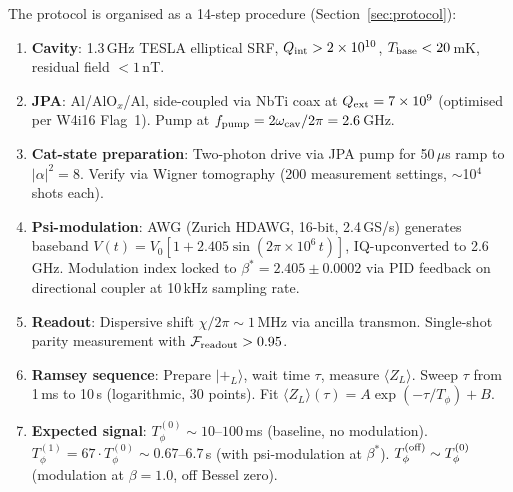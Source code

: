 \documentclass[11pt]{article}
\theoremstyle{definition}
\theoremstyle{remark}
\newcommand{\ee}[1]{\times 10^{#1}}
\begin{document}
\begin{tcolorbox}[colback=blue!5!white, colframe=blue!60!black,
  title=\textbf{W4i17 TOP 5 FINDINGS --- READ FIRST}]
\begin{enumerate}[nosep]
  The protocol is organised as a 14-step procedure (Section~\ref{sec:protocol}):
  \begin{enumerate}[nosep]
    \item \textbf{Cavity}: 1.3\,GHz TESLA elliptical SRF, $Q_{\rm int} > 2\ee{10}$,
      $T_{\rm base} < 20$\,mK, residual field $< 1$\,nT.
    \item \textbf{JPA}: Al/AlO$_x$/Al, side-coupled via NbTi coax at
      $Q_{\rm ext} = 7\ee{9}$ (optimised per W4i16 Flag~1). Pump at
      $f_{\rm pump} = 2\omega_{\rm cav}/2\pi = 2.6$\,GHz.
    \item \textbf{Cat-state preparation}: Two-photon drive via JPA pump
      for 50\,$\mu$s ramp to $|\alpha|^2 = 8$. Verify via Wigner
      tomography (200 measurement settings, $\sim$10$^4$ shots each).
    \item \textbf{Psi-modulation}: AWG (Zurich HDAWG, 16-bit, 2.4\,GS/s)
      generates baseband $V(t) = V_0[1 + 2.405\sin(2\pi\ee{6}\,t)]$,
      IQ-upconverted to 2.6\,GHz. Modulation index locked to
      $\beta^* = 2.405 \pm 0.0002$ via PID feedback on directional
      coupler at 10\,kHz sampling rate.
    \item \textbf{Readout}: Dispersive shift $\chi/2\pi \sim 1$\,MHz via
      ancilla transmon. Single-shot parity measurement with
      $\mathcal{F}_{\rm readout} > 0.95$.
    \item \textbf{Ramsey sequence}: Prepare $|+_L\rangle$, wait time $\tau$,
      measure $\langle Z_L\rangle$. Sweep $\tau$ from 1\,ms to 10\,s
      (logarithmic, 30 points). Fit $\langle Z_L\rangle(\tau) =
      A\exp(-\tau/T_\phi) + B$.
    \item \textbf{Expected signal}: $T_\phi^{(0)} \sim 10$--$100$\,ms
      (baseline, no modulation). $T_\phi^{(1)} = 67 \cdot T_\phi^{(0)}
      \sim 0.67$--$6.7$\,s (with psi-modulation at $\beta^*$).
      $T_\phi^{(\rm off)} \sim T_\phi^{(0)}$ (modulation at $\beta = 1.0$,
      off Bessel zero).
  \end{enumerate}


\end{enumerate}
\end{tcolorbox}
\end{document}
